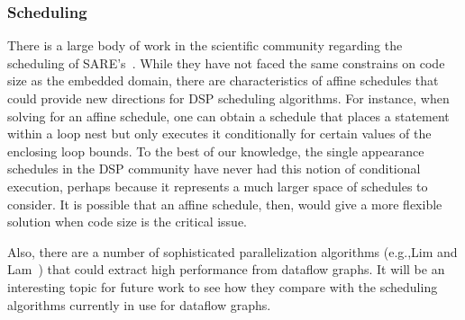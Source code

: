 \subsubsection{Scheduling}

There is a large body of work in the scientific community regarding
the scheduling of SARE's~\cite{DRV00}.  While they have not faced the
same constrains on code size as the embedded domain, there are
characteristics of affine schedules that could provide new directions
for DSP scheduling algorithms.  For instance, when solving for an
affine schedule, one can obtain a schedule that places a statement
within a loop nest but only executes it conditionally for certain
values of the enclosing loop bounds.  To the best of our knowledge,
the single appearance schedules in the DSP community have never had
this notion of conditional execution, perhaps because it represents a
much larger space of schedules to consider.  It is possible that an
affine schedule, then, would give a more flexible solution when code
size is the critical issue.  

Also, there are a number of sophisticated parallelization algorithms
(e.g.,Lim and Lam~\cite{Lim01}) that could extract high performance
from dataflow graphs.  It will be an interesting topic for future work
to see how they compare with the scheduling algorithms currently in
use for dataflow graphs.







